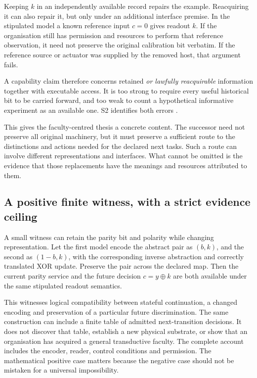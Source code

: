 Keeping \(k\) in an independently available record repairs the example. Reacquiring it can also repair it, but only under an additional interface premise. In the stipulated model a known reference input \(c=0\) gives readout \(k\). If the organisation still has permission and resources to perform that reference observation, it need not preserve the original calibration bit verbatim. If the reference source or actuator was supplied by the removed host, that argument fails.

A capability claim therefore concerns retained \emph{or lawfully reacquirable} information together with executable access. It is too strong to require every useful historical bit to be carried forward, and too weak to count a hypothetical informative experiment as an available one. S2 identifies both errors \cite[\S\S2--3,5--7]{S2}.

This gives the faculty-centred thesis a concrete content. The successor need not preserve all original machinery, but it must preserve a sufficient route to the distinctions and actions needed for the declared next tasks. Such a route can involve different representations and interfaces. What cannot be omitted is the evidence that those replacements have the meanings and resources attributed to them.

\subsection{A positive finite witness, with a strict evidence ceiling}

A small witness can retain the parity bit and polarity while changing representation. Let the first model encode the abstract pair as \((b,k)\), and the second as \((1-b,k)\), with the corresponding inverse abstraction and correctly translated XOR update. Preserve the pair across the declared map. Then the current parity service and the future decision \(c=y\oplus k\) are both available under the same stipulated readout semantics.

This witnesses logical compatibility between stateful continuation, a changed encoding and preservation of a particular future discrimination. The same construction can include a finite table of admitted next-transition decisions. It does not discover that table, establish a new physical substrate, or show that an organisation has acquired a general transductive faculty. The complete account includes the encoder, reader, control conditions and permission. The mathematical positive case matters because the negative case should not be mistaken for a universal impossibility.

